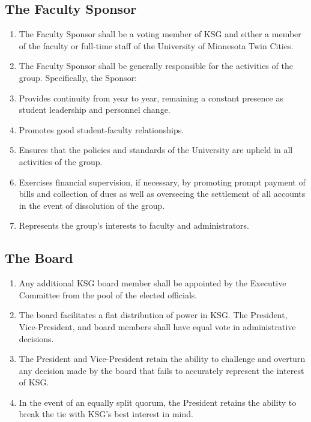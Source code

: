 \documentclass[12pt,letterpaper]{article}
\begin{document}
\subsection{The Faculty Sponsor}
\begin{enumerate}
  \item The Faculty Sponsor shall be a voting member of KSG and either a member of
        the faculty or full-time staff of the University of Minnesota Twin Cities.
  \item The Faculty Sponsor shall be generally responsible for the activities of the
        group. Specifically, the Sponsor:
  \item Provides continuity from year to year, remaining a constant presence as
        student leadership and personnel change.
  \item Promotes good student-faculty relationships.
  \item Ensures that the policies and standards of the University are upheld in all
        activities of the group.
  \item Exercises financial supervision, if necessary, by promoting prompt payment of
        bills and collection of dues as well as overseeing the settlement of all
        accounts in the event of dissolution of the group.
  \item Represents the group's interests to faculty and administrators.
\end{enumerate}

\subsection{The Board}
\begin{enumerate}
  \item Any additional KSG board member shall be appointed by the Executive Committee from
        the pool of the elected officials.
  \item The board facilitates a flat distribution of power in KSG. The President, Vice-President,
        and board members shall have equal vote in administrative decisions.
  \item The President and Vice-President retain the ability to challenge and overturn any
        decision made by the board that fails to accurately represent the interest of KSG.
  \item In the event of an equally split quorum, the President retains the ability to
        break the tie with KSG's best interest in mind.
\end{enumerate}
\end{document}
